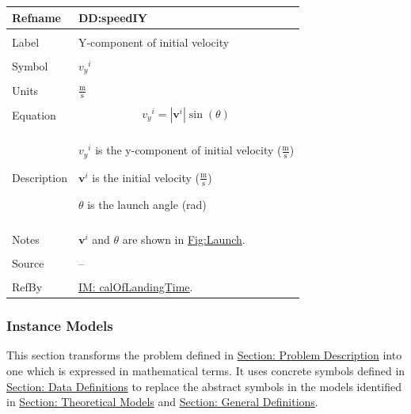 \documentclass[12pt]{article}
\begin{document}
\noindent \begin{minipage}{\textwidth}
\begin{tabular}{p{} p{}}
\toprule \textbf{Refname} & \textbf{DD:speedIY}
\label{DD:speedIY}
\\ \midrule \\
Label & Y-component of initial velocity
\\ \midrule \\
Symbol & ${{v_{y}}^{i}}$
\\ \midrule \\
Units & $\frac{\text{m}}{\text{s}}$
\\ \midrule \\
Equation & \begin{displaymath}
           {{v_{y}}^{i}}=|{\mathbf{v}^{i}}| \sin\left(θ\right)
           \end{displaymath}
\\ \midrule \\
Description & \begin{symbDescription}
              \item{${{v_{y}}^{i}}$ is the y-component of initial velocity ($\frac{\text{m}}{\text{s}}$)}
              \item{${\mathbf{v}^{i}}$ is the initial velocity ($\frac{\text{m}}{\text{s}}$)}
              \item{$θ$ is the launch angle (rad)}
              \end{symbDescription}
\\ \midrule \\
Notes & ${\mathbf{v}^{i}}$ and $θ$ are shown in \hyperref[Figure:Launch]{Fig:Launch}.
\\ \midrule \\
Source & --
\\ \midrule \\
RefBy & \hyperref[IM:calOfLandingTime]{IM: calOfLandingTime}.
\\ \bottomrule \end{tabular}
\end{minipage}
\subsubsection{Instance Models}
\label{Sec:IMs}
This section transforms the problem defined in \hyperref[Sec:ProbDesc]{Section: Problem Description} into one which is expressed in mathematical terms. It uses concrete symbols defined in \hyperref[Sec:DDs]{Section: Data Definitions} to replace the abstract symbols in the models identified in \hyperref[Sec:TMs]{Section: Theoretical Models} and \hyperref[Sec:GDs]{Section: General Definitions}.
\par~
\end{document}
